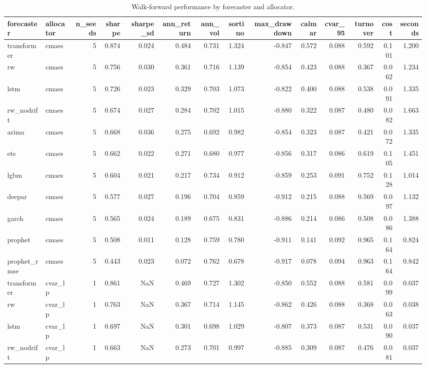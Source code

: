 \begin{table}
\caption{Walk-forward performance by forecaster and allocator.}
\label{tab:main}
\begin{tabular}{llrrrrrrrrrrrr}
\toprule
forecaster & allocator & n\_seeds & sharpe & sharpe\_sd & ann\_return & ann\_vol & sortino & max\_drawdown & calmar & cvar\_95 & turnover & cost & seconds \\
\midrule
transformer & cmaes & 5 & 0.874 & 0.024 & 0.484 & 0.731 & 1.324 & -0.847 & 0.572 & 0.088 & 0.592 & 0.101 & 1.200 \\
rw & cmaes & 5 & 0.756 & 0.030 & 0.361 & 0.716 & 1.139 & -0.854 & 0.423 & 0.088 & 0.367 & 0.062 & 1.234 \\
lstm & cmaes & 5 & 0.726 & 0.023 & 0.329 & 0.703 & 1.073 & -0.822 & 0.400 & 0.088 & 0.538 & 0.091 & 1.335 \\
rw\_nodrift & cmaes & 5 & 0.674 & 0.027 & 0.284 & 0.702 & 1.015 & -0.880 & 0.322 & 0.087 & 0.480 & 0.082 & 1.663 \\
arima & cmaes & 5 & 0.668 & 0.036 & 0.275 & 0.692 & 0.982 & -0.854 & 0.323 & 0.087 & 0.421 & 0.072 & 1.335 \\
ets & cmaes & 5 & 0.662 & 0.022 & 0.271 & 0.680 & 0.977 & -0.856 & 0.317 & 0.086 & 0.619 & 0.105 & 1.451 \\
lgbm & cmaes & 5 & 0.604 & 0.021 & 0.217 & 0.734 & 0.912 & -0.859 & 0.253 & 0.091 & 0.752 & 0.128 & 1.014 \\
deepar & cmaes & 5 & 0.577 & 0.027 & 0.196 & 0.704 & 0.859 & -0.912 & 0.215 & 0.088 & 0.569 & 0.097 & 1.132 \\
garch & cmaes & 5 & 0.565 & 0.024 & 0.189 & 0.675 & 0.831 & -0.886 & 0.214 & 0.086 & 0.508 & 0.086 & 1.388 \\
prophet & cmaes & 5 & 0.508 & 0.011 & 0.128 & 0.759 & 0.780 & -0.911 & 0.141 & 0.092 & 0.965 & 0.164 & 0.824 \\
prophet\_rmse & cmaes & 5 & 0.443 & 0.023 & 0.072 & 0.762 & 0.678 & -0.917 & 0.078 & 0.094 & 0.963 & 0.164 & 0.842 \\
transformer & cvar\_lp & 1 & 0.861 & NaN & 0.469 & 0.727 & 1.302 & -0.850 & 0.552 & 0.088 & 0.581 & 0.099 & 0.037 \\
rw & cvar\_lp & 1 & 0.763 & NaN & 0.367 & 0.714 & 1.145 & -0.862 & 0.426 & 0.088 & 0.368 & 0.063 & 0.038 \\
lstm & cvar\_lp & 1 & 0.697 & NaN & 0.301 & 0.698 & 1.029 & -0.807 & 0.373 & 0.087 & 0.531 & 0.090 & 0.037 \\
rw\_nodrift & cvar\_lp & 1 & 0.663 & NaN & 0.273 & 0.701 & 0.997 & -0.885 & 0.309 & 0.087 & 0.476 & 0.081 & 0.037 \\

\end{tabular}
\end{table}
